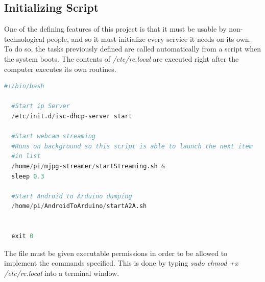 












\subsection{Initializing Script} 

One of the defining features of this project is that it must be usable by non-technological people, and so it must initialize every service it needs on its own. \\

To do so, the tasks previously defined are called automatically from a script when the system boots. The contents of \textit{/etc/rc.local} are executed right after the computer executes its own routines.\\


	\begin{minipage}{\linewidth}%
	\begin{lstlisting}[label=rc.local,caption=Initialization Script {[} /etc/rc.local {]} ,language=python ]
  #!/bin/bash

  #Start ip Server
  /etc/init.d/isc-dhcp-server start

  #Start webcam streaming 
  #Runs on background so this script is able to launch the next item 
  #in list
  /home/pi/mjpg-streamer/startStreaming.sh &
  sleep 0.3

  #Start Android to Arduino dumping
  /home/pi/AndroidToArduino/startA2A.sh 


  exit 0


	\end{lstlisting}
	\end{minipage}

\bigskip
The file must be given executable permissions in order to be allowed to implement the commands specified. This is done by typing \textit{sudo chmod +x /etc/rc.local} into a terminal window.